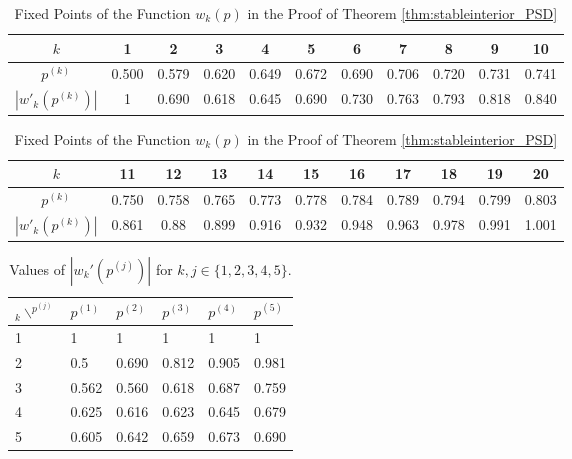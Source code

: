 \documentclass[12pt]{article}
\providecommand{\tabularnewline}{\\}
\numberwithin{equation}{section}
\numberwithin{figure}{section}
\theoremstyle{definition}
\theoremstyle{plain}
\theoremstyle{plain}
\theoremstyle{plain}
\theoremstyle{remark}
\theoremstyle{plain}
\theoremstyle{plain}
\begin{document}
\begin{table}[h]
\caption{Fixed Points of the Function $w_k(p)$ in the Proof of Theorem \ref{thm:stableinterior_PSD}} %
\centering

\begin{tabular}{|c|c|c|c|c|c|c|c|c|c|c|}
\hline 
$k$ & 1 & 2 & 3 & 4 & 5 & 6 & 7 & 8 & 9 & 10\tabularnewline
\hline 
$p^{\left(k\right)}$ & 0.500 & 0.579 & 0.620 & 0.649 & 0.672 & 0.690 & 0.706 & 0.720 & 0.731 & 0.741\tabularnewline
\hline 
$\ensuremath{|w'_{k}(p^{\left(k\right)})|}$ & 1 & 0.690 & 0.618 & 0.645 & 0.690 & 0.730 & 0.763 & 0.793 & 0.818 & 0.840 \tabularnewline
\hline 
\end{tabular}

\medskip{}

\begin{tabular}{|c|c|c|c|c|c|c|c|c|c|c|}
\hline 
$k$ & 11 & 12 & 13 & 14 & 15 & 16 & 17 & 18 & 19 & 20\tabularnewline
\hline 
$p^{\left(k\right)}$ & 0.750 & 0.758 & 0.765 & 0.773 & 0.778 & 0.784 & 0.789 & 0.794 & 0.799 & 0.803\tabularnewline
\hline 
$\ensuremath{|w'_{k}(p^{\left(k\right)})|}$ & 0.861 & 0.88 & 0.899 & 0.916 & 0.932 & 0.948 & 0.963 & 0.978 & 0.991 & 1.001 \tabularnewline
\hline 
\end{tabular}

 \label{table:fixedpoints} %
\end{table}

\begin{table}[h]
\caption{Values of $|w_k'(p^{(j)})|$ for $k,j \in \{1,2,3,4,5\}.$} %
\centering
\begin{tabular}{ |p{0.7cm}|p{1.5cm}|p{1.5cm}|p{1.5cm}|p{1.5cm}|p{1.5cm}|  }
 \hline
 $_{k} \backslash ^{p^{(j)}}$& $p^{(1)}$ &$p^{(2)}$&$p^{(3)}$ &$p^{(4)}$&$p^{(5)}$\\
 \hline
 1   & 1   &1 & 1    &1 & 1\\
 \hline
 2   & 0.5    &0.690 & 0.812    &0.905& 0.981\\
 \hline
 3   & 0.562    &0.560 & 0.618    &0.687 & 0.759\\
 \hline
 4   & 0.625    &0.616 & 0.623    &0.645 & 0.679\\
 \hline
 5   & 0.605    &0.642 & 0.659    &0.673 & 0.690\\
 \hline
\end{tabular}
 \label{table:absvalue_fixpoints} %
\end{table}


\end{document}
